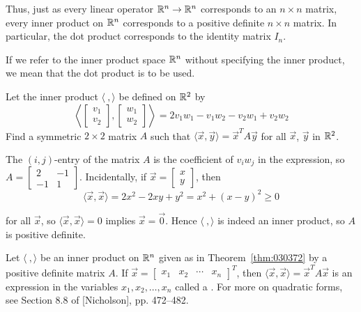 \documentclass{ximera}
\begin{document}
Thus, just as every linear operator $\mathbb{R}^n \to \mathbb{R}^n$ corresponds to an $n \times n$ matrix, every inner product on $\mathbb{R}^n$ corresponds to a positive definite $n \times n$ matrix. In particular, the dot product corresponds to the identity matrix $I_{n}$.

\begin{remark}
    If we refer to the inner product space $\mathbb{R}^n$ without specifying the inner product, we mean that the dot product is to be used.
\end{remark}

\begin{example}\label{exa:030413}
Let the inner product $\langle\ , \rangle$ be defined on $\mathbb{R}^2$ by
\begin{equation*}
\left \langle
\left[ \begin{array}{c}
v_1 \\
v_2
\end{array} \right], \left[ \begin{array}{c}
w_1 \\
w_2
\end{array} \right]
\right \rangle
= 2v_1w_1 - v_1w_2 - v_2w_1 + v_2w_2
\end{equation*}
Find a symmetric $2 \times 2$ matrix $A$ such that $\langle\vec{x}, \vec{y}\rangle = \vec{x}^{T}A\vec{y}$ for all $\vec{x}$, $\vec{y}$ in $\mathbb{R}^2$.

\begin{explanation}
The $(i, j)$-entry of the matrix $A$ is the coefficient of $v_{i}w_{j}$ in the expression, so
$ A =
\left[ \begin{array}{rr}
2 & -1 \\
-1 & 1
\end{array} \right]$. Incidentally, if
$\vec{x} =
\left[ \begin{array}{r}
x \\
y
\end{array} \right]$, then
\begin{equation*}
\langle \vec{x}, \vec{x} \rangle = 2x^2 - 2xy + y^2 = x^2 +(x - y)^2 \geq 0
\end{equation*}

for all $\vec{x}$, so $\langle\vec{x}, \vec{x}\rangle = 0$ implies
$\vec{x} = \vec{0}$. Hence $\langle\ , \rangle$ is indeed an inner product, so $A$ is positive definite.
\end{explanation}
\end{example}

Let $\langle\ , \rangle$ be an inner product on $\mathbb{R}^n$ given as in Theorem~\ref{thm:030372} by a positive definite matrix $A$. If $\vec{x} =
\left[ \begin{array}{cccc}
x_1 & x_2 & \cdots & x_n
\end{array} \right]^T $, then $\langle\vec{x}, \vec{x}\rangle = \vec{x}^{T}A\vec{x}$ is an expression in the variables
$x_{1}, x_{2}, \dots, x_{n}$ called a . For more on quadratic forms, see Section 8.8 of [Nicholson], pp. 472--482.
\end{document}
